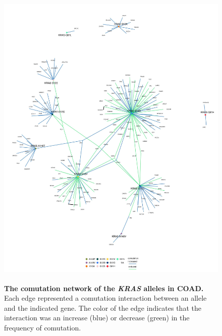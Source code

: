 \documentclass[english, 12pt, letterpaper]{article}
\newcommand{\KRAS}{\emph{KRAS}}
\begin{document}
\begin{figure}[p]
\centering
\includegraphics[height=150mm]{figures/SuppFigure_05.jpeg}
\caption{
    \textbf{The comutation network of the \KRAS{} alleles in COAD.} Each edge represented a comutation interaction between an allele and the indicated gene. The color of the edge indicates that the interaction was an increase (blue) or decrease (green) in the frequency of comutation.
}
\label{sfig:coad_labeled-comutation}
\end{figure}
\end{document}
